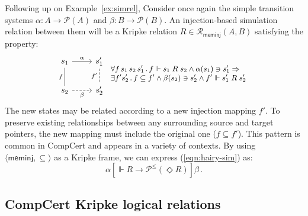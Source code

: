 \documentclass[sigplan,screen]{acmart}
\newcommand{\figsize}{\small}
\newcommand{\kw}[1]{\ensuremath{ \mathsf{#1} }}
\newcommand{\ifr}[1]{\mathrel{[{#1}]}}
\begin{document}
\begin{example} \label{ex:sim} %
Following up on Example~\ref{ex:simrel},
Consider once again the simple transition systems
$\alpha : A \rightarrow \mathcal{P}(A)$ and
$\beta : B \rightarrow \mathcal{P}(B)$.
An injection-based simulation relation between them
will be a Kripke relation
$R \in \mathcal{R}_\kw{meminj}(A, B)$
satisfying the property:
\begin{equation} \label{eqn:hairy-sim}
  \begin{tikzcd}
    s_1 \arrow[r, "\alpha"]
        \arrow[d, dash, "f"'] &
    s_1' \arrow[d, dashed, dash, "f'"'] \\ %
    s_2 \arrow[r, dashed, "\beta"'] &
    s_2'
  \end{tikzcd}
 {\figsize
  \begin{array}{l}
    \forall f \, s_1 \, s_2 \, s_1' \,.\,
      f \Vdash s_1 \mathrel{R} s_2 \wedge
      \alpha(s_1) \ni s_1' \Rightarrow \\
    \exists f' s_2' \,.\,
      f \subseteq f' \wedge
      \beta(s_2) \ni s_2' \wedge
      f' \Vdash s_1' \mathrel{R} s_2'
  \end{array}}
\end{equation}
The new states may be related according to
a new injection mapping $f'$.
To preserve existing relationships
between any surrounding source and target pointers,
the new mapping must include
the original one ($f \subseteq f'$).
This pattern is common in CompCert
and appears in a variety of contexts.
By using $\langle \kw{meminj}, {\subseteq} \rangle$
as a Kripke frame,
we can express
(\ref{eqn:hairy-sim}) as:
\[
  \alpha \ifr{\Vdash R \rightarrow \mathcal{P}^\le(\Diamond R)} \beta \,.
\]
\end{example}


\subsection{CompCert Kripke logical relations} \label{sec:cklrdef} %
\end{document}
